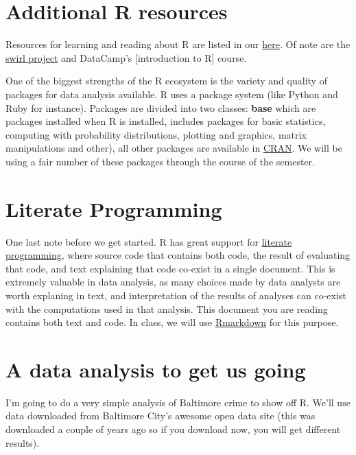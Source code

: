 \documentclass[12pt,]{book}
\theoremstyle{definition}
\theoremstyle{definition}
\theoremstyle{definition}
\theoremstyle{remark}
\begin{document}
\section{Additional R resources}\label{additional-r-resources}

Resources for learning and reading about R are listed in our
\href{http://www.hcbravo.org/IntroDataScience/resources/}{here}. Of note
are the \href{http://swirlstats.com/}{swirl project} and DataCamp's
{[}introduction to R{]} course.

One of the biggest strengths of the R ecosystem is the variety and
quality of packages for data analysis available. R uses a package system
(like Python and Ruby for instance). Packages are divided into two
classes: \textbf{base} which are packages installed when R is installed,
includes packages for basic statistics, computing with probability
distributions, plotting and graphics, matrix manipulations and other),
all other packages are available in
\href{http://cran.r-project.org}{CRAN}. We will be using a fair number
of these packages through the course of the semester.

\section{Literate Programming}\label{literate-programming}

One last note before we get started. R has great support for
\href{http://en.wikipedia.org/wiki/Literate_programming}{literate
programming}, where source code that contains both code, the result of
evaluating that code, and text explaining that code co-exist in a single
document. This is extremely valuable in data analysis, as many choices
made by data analysts are worth explaning in text, and interpretation of
the results of analyses can co-exist with the computations used in that
analysis. This document you are reading contains both text and code. In
class, we will use \href{http://rmarkdown.rstudio.com/}{Rmarkdown} for
this purpose.

\section{A data analysis to get us
going}\label{a-data-analysis-to-get-us-going}

I'm going to do a very simple analysis of Baltimore crime to show off R.
We'll use data downloaded from Baltimore City's awesome open data site
(this was downloaded a couple of years ago so if you download now, you
will get different results).
\end{document}
